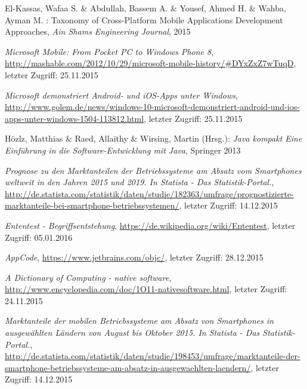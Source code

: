 \begin{thebibliography}{}
El-Kassas, Wafaa S. \& Abdullah, Bassem A. \&  Yousef, Ahmed H. \&  Wahba, Ayman M. :
\glqq Taxonomy of Cross-Platform Mobile Applications Development Approaches\grqq, 
\emph{Ain Shams Engineering Journal}, 2015

\emph{Microsoft Mobile: From Pocket PC to Windows Phone 8},
\url{http://mashable.com/2012/10/29/microsoft-mobile-history/#DYxZxZ7wTuqD}, letzter Zugriff: 25.11.2015

\emph{Microsoft demonstriert Android- und iOS-Apps unter Windows},
\url{http://www.golem.de/news/windows-10-microsoft-demonstriert-android-und-ios-apps-unter-windows-1504-113812.html}, letzter Zugriff: 25.11.2015

Hözlz, Matthias \& Raed, Allaithy \& Wirsing, Martin (Hrsg.): 
\emph{Java kompakt Eine Einführung in die Software-Entwicklung
	mit Java}, Springer 2013

\emph{Prognose zu den Marktanteilen der Betriebssysteme am Absatz vom Smartphones weltweit in den Jahren 2015 und 2019. In Statista - Das Statistik-Portal.},
\url{http://de.statista.com/statistik/daten/studie/182363/umfrage/prognostizierte-marktanteile-bei-smartphone-betriebssystemen/}, letzter Zugriff: 14.12.2015

\emph{Ententest - Begriffsentstehung},
\url{https://de.wikipedia.org/wiki/Ententest}, letzter Zugriff: 05.01.2016

\emph{AppCode},
\url{https://www.jetbrains.com/objc/}, letzter Zugriff: 28.12.2015

\emph{A Dictionary of Computing - native software},
\url{http://www.encyclopedia.com/doc/1O11-nativesoftware.html}, letzter Zugriff: 24.11.2015

\emph{Marktanteile der mobilen Betriebssysteme am Absatz von Smartphones in ausgewählten Ländern von August bis Oktober 2015. In Statista - Das Statistik-Portal.},
\url{http://de.statista.com/statistik/daten/studie/198453/umfrage/marktanteile-der-smartphone-betriebssysteme-am-absatz-in-ausgewaehlten-laendern/}, letzter Zugriff: 14.12.2015


\end{thebibliography}
